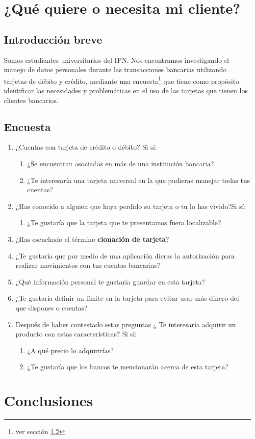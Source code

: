 \documentclass[11pt]{book}
\begin{document}
\chapter{¿Qué quiere o necesita mi cliente?}

\section{Introducción breve}

Somos estudiantes universitarios del IPN. Nos encontramos investigando el manejo de datos personales durante las transacciones bancarias utilizando tarjetas de débito y crédito, mediante una encuesta\footnote{ver sección \ref{sec:Encuesta}} que tiene como propósito identificar las necesidades y problemáticas en el uso de las tarjetas que tienen los clientes bancarios.

\section{Encuesta}
\label{sec:Encuesta}
\begin{enumerate}
	\item ¿Cuentas con tarjeta de crédito o débito? Si sí:
		\begin{enumerate}
			\item ¿Se encuentran asociadas en más de una institución bancaria?
			\item ¿Te interesaría una tarjeta universal en la que pudieras manejar todas
			tus cuentas?
		\end{enumerate}
	\item ¿Has conocido a alguien que haya perdido su tarjeta o tu lo has vivido?Si sí:
		\begin{enumerate}
			\item ¿Te gustaría que la tarjeta que te presentamos fuera localizable?
		\end{enumerate}
	\item ¿Has escuchado el término \textbf{clonación de tarjeta}?
		
	\item ¿Te gustaría que por medio de una aplicación dieras la autorización para realizar movimientos con tus cuentas bancarias?
	
	\item ¿Qué información personal te gustaría guardar en esta tarjeta?
	
	\item ¿Te gustaría definir un límite en la tarjeta para evitar usar más dinero del que dispones o cuentas?
	
	\item Después de haber contestado estas preguntas ¿ Te interesaría adquirir un producto con estas características? Si sí:
		\begin{enumerate}
			\item ¿A qué precio lo adquirirías?
			\item ¿Te gustaría que los bancos te mencionarán acerca de esta tarjeta?
		\end{enumerate}
\end{enumerate}




	
	
	\chapter{Conclusiones}
	
	
	
\end{document}
